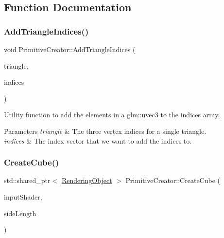 \subsection{Function Documentation}
\hypertarget{namespace_primitive_creator_acbc473c3e4d3b99d8e2b9d302e095978}{}\label{namespace_primitive_creator_acbc473c3e4d3b99d8e2b9d302e095978} 
\subsubsection{\texorpdfstring{Add\+Triangle\+Indices()}{AddTriangleIndices()}}
{\footnotesize\ttfamily void Primitive\+Creator\+::\+Add\+Triangle\+Indices (\begin{DoxyParamCaption}\item[{const glm\+::uvec3 \&}]{triangle,  }\item[{\hyperlink{class_rendering_object_a9931c88bca3384065c6691dfe1e60af1}{Rendering\+Object\+::\+Index\+Array} \&}]{indices }\end{DoxyParamCaption})}



Utility function to add the elements in a glm\+::uvec3 to the indices array. 


\begin{DoxyParams}{Parameters}
{\em triangle} & The three vertex indices for a single triangle. \\
\hline
{\em indices} & The index vector that we want to add the indices to. \\
\hline
\end{DoxyParams}
\hypertarget{namespace_primitive_creator_a4fcaafc02f9b75b4e6e9720e7c15c079}{}\label{namespace_primitive_creator_a4fcaafc02f9b75b4e6e9720e7c15c079} 
\subsubsection{\texorpdfstring{Create\+Cube()}{CreateCube()}}
{\footnotesize\ttfamily std\+::shared\+\_\+ptr$<$ \hyperlink{class_rendering_object}{Rendering\+Object} $>$ Primitive\+Creator\+::\+Create\+Cube (\begin{DoxyParamCaption}\item[{std\+::shared\+\_\+ptr$<$ \hyperlink{class_shader_program}{Shader\+Program} $>$}]{input\+Shader,  }\item[{float}]{side\+Length }\end{DoxyParamCaption})}



